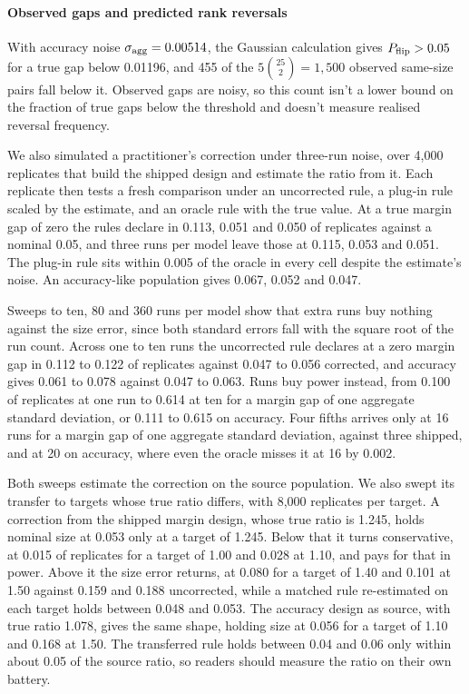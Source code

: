 \paragraph{Observed gaps and predicted rank reversals}
With accuracy noise $\sigma_{\rm agg}=0.00514$, the Gaussian calculation gives $P_{\rm flip}>0.05$ for a true gap below 0.01196, and 455 of the $5\binom{25}{2}=1{,}500$ observed same-size pairs fall below it. Observed gaps are noisy, so this count isn't a lower bound on the fraction of true gaps below the threshold and doesn't measure realised reversal frequency.

We also simulated a practitioner's correction under three-run noise, over 4,000 replicates that build the shipped design and estimate the ratio from it. Each replicate then tests a fresh comparison under an uncorrected rule, a plug-in rule scaled by the estimate, and an oracle rule with the true value. At a true margin gap of zero the rules declare in 0.113, 0.051 and 0.050 of replicates against a nominal 0.05, and three runs per model leave those at 0.115, 0.053 and 0.051. The plug-in rule sits within 0.005 of the oracle in every cell despite the estimate's noise. An accuracy-like population gives 0.067, 0.052 and 0.047.

Sweeps to ten, 80 and 360 runs per model show that extra runs buy nothing against the size error, since both standard errors fall with the square root of the run count. Across one to ten runs the uncorrected rule declares at a zero margin gap in 0.112 to 0.122 of replicates against 0.047 to 0.056 corrected, and accuracy gives 0.061 to 0.078 against 0.047 to 0.063. Runs buy power instead, from 0.100 of replicates at one run to 0.614 at ten for a margin gap of one aggregate standard deviation, or 0.111 to 0.615 on accuracy. Four fifths arrives only at 16 runs for a margin gap of one aggregate standard deviation, against three shipped, and at 20 on accuracy, where even the oracle misses it at 16 by 0.002.

Both sweeps estimate the correction on the source population. We also swept its transfer to targets whose true ratio differs, with 8,000 replicates per target. A correction from the shipped margin design, whose true ratio is 1.245, holds nominal size at 0.053 only at a target of 1.245. Below that it turns conservative, at 0.015 of replicates for a target of 1.00 and 0.028 at 1.10, and pays for that in power. Above it the size error returns, at 0.080 for a target of 1.40 and 0.101 at 1.50 against 0.159 and 0.188 uncorrected, while a matched rule re-estimated on each target holds between 0.048 and 0.053. The accuracy design as source, with true ratio 1.078, gives the same shape, holding size at 0.056 for a target of 1.10 and 0.168 at 1.50. The transferred rule holds between 0.04 and 0.06 only within about 0.05 of the source ratio, so readers should measure the ratio on their own battery.
